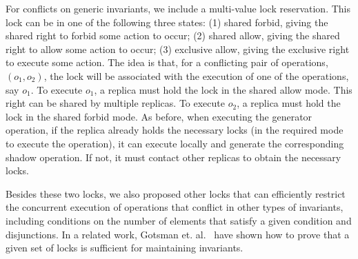 For conflicts on generic invariants, we include a multi-value lock 
reservation. This lock can be in one of the following three states: 
(1) shared forbid, giving the shared right to forbid some action to occur; 
(2) shared allow, giving the shared right to allow some action to occur; 
(3) exclusive allow, giving the exclusive right to execute some action.
The idea is that, for a conflicting pair of operations, $(o_1,o_2)$, 
the lock will be associated with the execution of one of the operations, 
say $o_1$.
To execute $o_1$, a replica must hold the lock in the shared allow mode.
This right can be shared by multiple replicas.
To execute $o_2$, a replica must hold the lock in the shared forbid mode.
As before, when executing the generator operation, if the replica already
holds the necessary locks (in the required mode to execute the operation), 
it can execute locally and generate the corresponding shadow operation.
If not, it must contact other replicas to obtain the necessary locks.

Besides these two locks, we also proposed other locks that can
efficiently restrict the concurrent execution of operations that conflict 
in other types of invariants, including conditions on the number of elements
that satisfy a given condition and disjunctions.
In a related work, Gotsman et. al.~\cite{GotsmanConsistencyReason}
have shown how to prove that a given set of locks is sufficient
for maintaining invariants.





